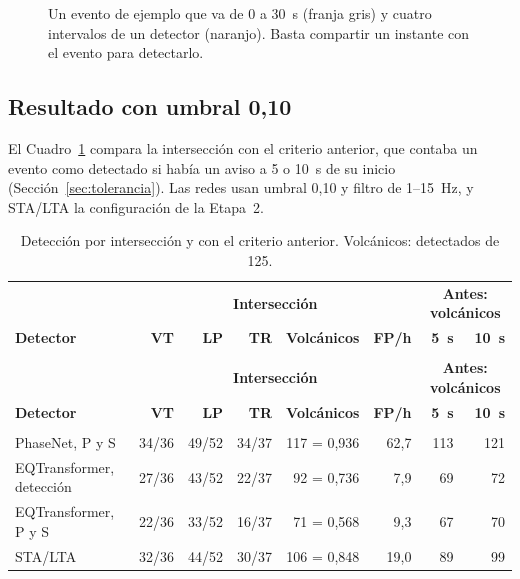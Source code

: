 \documentclass[11pt,a4paper,oneside,spanish,oldfontcommands]{memoir}
\newcommand{\cabecera}[2]{%
  \toprule #1 \\ \midrule \endfirsthead
  \multicolumn{#2}{l}{\itshape Cuadro \thetable{} (continuación)}\\
  \toprule #1 \\ \midrule \endhead
  \midrule \multicolumn{#2}{r}{\itshape Continúa en la página siguiente}\\ \endfoot
  \bottomrule \endlastfoot}
\begin{document}
\begin{figure}[H]
\centering
{}
\caption{Un evento de ejemplo que va de 0 a 30~s (franja gris) y cuatro intervalos de un detector (naranjo). Basta compartir un instante con el evento para detectarlo.}\label{fig:interseccion}
\end{figure}

\subsection*{Resultado con umbral 0,10}

El Cuadro~\ref{tab:criterios} compara la intersección con el criterio
anterior, que contaba un evento como detectado si había un aviso a 5 o 10~s de
su inicio (Sección~\ref{sec:tolerancia}). Las redes usan umbral 0,10 y filtro
de 1--15~Hz, y STA/LTA la configuración de la Etapa~2.

{\small
\setlength{\tabcolsep}{4pt}
\begin{longtable}{>{\raggedright\arraybackslash}p{4.2cm}rrrrrrr}
\caption{Detección por intersección y con el criterio anterior. Volcánicos: detectados de 125.}\label{tab:criterios}\\
\cabecera{ & \multicolumn{5}{c}{\textbf{Intersección}} & \multicolumn{2}{c}{\textbf{Antes: volcánicos}} \\ \textbf{Detector} & \textbf{VT} & \textbf{LP} & \textbf{TR} & \textbf{Volcánicos} & \textbf{FP/h} & \textbf{5~s} & \textbf{10~s}}{8}
PhaseNet, P y S & 34/36 & 49/52 & 34/37 & 117 = 0,936 & 62,7 & 113 & 121 \\
EQTransformer, detección & 27/36 & 43/52 & 22/37 & 92 = 0,736 & 7,9 & 69 & 72 \\
EQTransformer, P y S & 22/36 & 33/52 & 16/37 & 71 = 0,568 & 9,3 & 67 & 70 \\
STA/LTA & 32/36 & 44/52 & 30/37 & 106 = 0,848 & 19,0 & 89 & 99 \\
\end{longtable}
}
\end{document}
